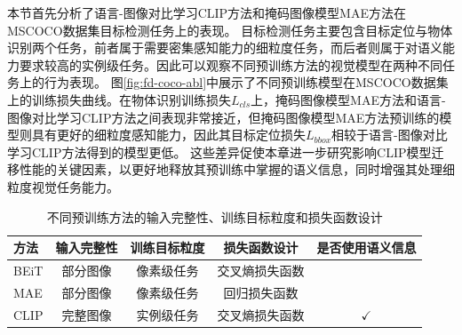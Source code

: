 
本节首先分析了语言-图像对比学习CLIP方法和掩码图像模型MAE方法在MSCOCO\cite{chen2015microsoft}数据集目标检测任务上的表现。
目标检测任务主要包含目标定位与物体识别两个任务\cite{ren2016faster}，前者属于需要密集感知能力的细粒度任务，而后者则属于对语义能力要求较高的实例级任务。因此可以观察不同预训练方法的视觉模型在两种不同任务上的行为表现。
图\ref{fig:fd-coco-abl}中展示了不同预训练模型在MSCOCO数据集上的训练损失曲线。在物体识别训练损失$L_{cls}$上，掩码图像模型MAE方法和语言-图像对比学习CLIP方法之间表现非常接近，但掩码图像模型MAE方法预训练的模型则具有更好的细粒度感知能力，因此其目标定位损失$L_{bbox}$相较于语言-图像对比学习CLIP方法得到的模型更低。
这些差异促使本章进一步研究影响CLIP模型迁移性能的关键因素，以更好地释放其预训练中掌握的语义信息，同时增强其处理细粒度视觉任务能力。

\begin{table}
\caption{
不同预训练方法的输入完整性、训练目标粒度和损失函数设计}
\centering
  \begin{tabular}{lcccc}
    \toprule
  方法 & 输入完整性 & 训练目标粒度 & 损失函数设计 & 是否使用语义信息 \\
  \midrule
  BEiT & 部分图像 & 像素级任务 & 交叉熵损失函数 & \\ 
  MAE & 部分图像 & 像素级任务 & 回归损失函数 & \\
  \midrule
  CLIP & 完整图像 & 实例级任务 & 交叉熵损失函数 & $\checkmark$  \\
\bottomrule
  \end{tabular}
\label{tab:fd-differences}
\end{table}



